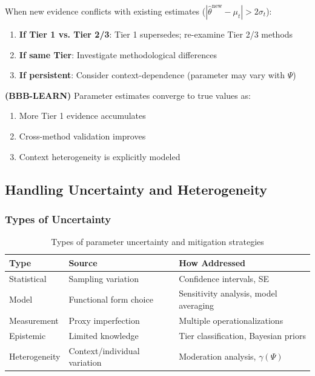 When new evidence conflicts with existing estimates ($|\hat{\theta}^{\text{new}} - \mu_t| > 2\sigma_t$):

\begin{enumerate}
    \item \textbf{If Tier 1 vs. Tier 2/3}: Tier 1 supersedes; re-examine Tier 2/3 methods
    \item \textbf{If same Tier}: Investigate methodological differences
    \item \textbf{If persistent}: Consider context-dependence (parameter may vary with $\Psi$)
\end{enumerate}

\begin{axiom}
\label{ax:bbb-learn}
\textbf{(BBB-LEARN)} Parameter estimates converge to true values as:
\begin{enumerate}
    \item More Tier 1 evidence accumulates
    \item Cross-method validation improves
    \item Context heterogeneity is explicitly modeled
\end{enumerate}
\end{axiom}

\subsection{Handling Uncertainty and Heterogeneity}
\label{sec:BBB-uncertainty}

\subsubsection{Types of Uncertainty}

\begin{table}[h]
\centering
\small
\begin{tabular}{p{3cm}p{4cm}p{5cm}}
\toprule
\textbf{Type} & \textbf{Source} & \textbf{How Addressed} \\
\midrule
Statistical & Sampling variation & Confidence intervals, SE \\
Model & Functional form choice & Sensitivity analysis, model averaging \\
Measurement & Proxy imperfection & Multiple operationalizations \\
Epistemic & Limited knowledge & Tier classification, Bayesian priors \\
Heterogeneity & Context/individual variation & Moderation analysis, $\gamma(\Psi)$ \\
\bottomrule
\end{tabular}
\caption{Types of parameter uncertainty and mitigation strategies}
\label{tab:uncertainty-types}
\end{table}


